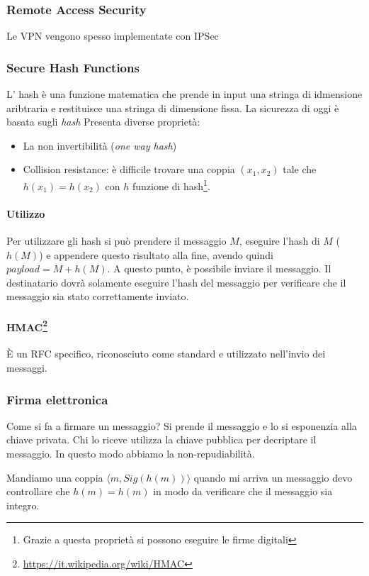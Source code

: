 \subsubsection{Remote Access Security}

Le VPN vengono spesso implementate con IPSec 

\subsubsection{Secure Hash Functions}

L' hash è una funzione matematica che prende in input una stringa di idmensione 
aribtraria e restituisce una stringa di dimensione fissa. La sicurezza di oggi è 
basata sugli \textit{hash} Presenta diverse proprietà:
\begin{itemize}
\item La non invertibilità (\emph{one way hash})
\item Collision resistance: è difficile trovare una coppia $(x_1,x_2)$ tale che 
$h(x_1) = h(x_2)$ con $h$ funzione di hash\footnote{Grazie a questa proprietà si 
possono eseguire le firme digitali}.
\end{itemize}

\paragraph*{Utilizzo}

Per utilizzare gli hash si può prendere il messaggio $M$, eseguire l'hash di $M$ 
($h(M)$) e appendere questo risultato alla fine, avendo quindi $payload = M + 
h(M)$. A questo punto, è possibile inviare il messaggio. Il destinatario dovrà 
solamente eseguire l'hash del messaggio per verificare che il messaggio sia 
stato correttamente inviato.

\paragraph*{HMAC\footnote{\url{https://it.wikipedia.org/wiki/HMAC}}}

È un RFC specifico, riconosciuto come standard e utilizzato nell'invio dei 
messaggi.


\subsubsection{Firma elettronica}

Come si fa a firmare un messaggio? Si prende il messaggio e lo si esponenzia 
alla chiave privata. Chi lo riceve utilizza la chiave pubblica per decriptare il 
messaggio. In questo modo abbiamo la non-repudiabilità.

Mandiamo una coppia $ \langle m, Sig(h(m)) \rangle $ quando mi arriva un 
messaggio devo controllare che
$h(m) = h(m)$ in modo da verificare che il messaggio sia integro.
